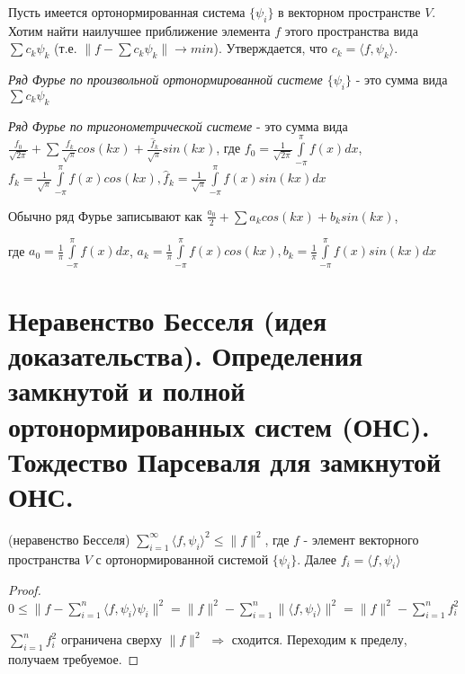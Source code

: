 \documentclass{article}
\begin{document}
	Пусть имеется ортонормированная система $\{{\psi_i}\}$ в векторном пространстве $V$. Хотим найти наилучшее приближение элемента $f$ этого пространства вида $\sum c_k \psi_k$ (т.е. $\|f-\sum c_k \psi_k\| \rightarrow min$). Утверждается, что $c_k=\langle f, \psi_k\rangle$.
	
	 \begin{definition}
	 	\textit{Ряд Фурье по произвольной ортонормированной системе $\{{\psi_i}\}$} - это сумма вида $\sum c_k \psi_k$
	 \end{definition}
 
	 \begin{definition}
	 	\textit{Ряд Фурье по тригонометрической системе} - это сумма вида $\frac{f_0}{\sqrt{2\pi}} +\sum \frac{f_k}{\sqrt{\pi}}cos(kx) + \frac{\hat f_k}{\sqrt{\pi}}sin(kx)$, где $f_0=\frac{1}{\sqrt{2\pi}}\int\limits_{-\pi}^{\pi} f(x) dx$, $f_k=\frac{1}{\sqrt{\pi}}\int\limits_{-\pi}^{\pi} f(x)cos(kx), \hat f_k=\frac{1}{\sqrt{\pi}}\int\limits_{-\pi}^{\pi} f(x)sin(kx) dx$
	 \end{definition}
 
 	Обычно ряд Фурье записывают как $\frac{a_0}{2} + \sum a_k cos(kx) + b_k sin(kx)$,
 	
 	где $a_0=\frac{1}{\pi}\int\limits_{-\pi}^{\pi} f(x) dx$, $a_k=\frac{1}{\pi}\int\limits_{-\pi}^{\pi} f(x)cos(kx), b_k=\frac{1}{\pi}\int\limits_{-\pi}^{\pi} f(x)sin(kx) dx$
	
	\section{Неравенство Бесселя (идея доказательства). Определения замкнутой и полной ортонормированных систем (ОНС). Тождество Парсеваля для замкнутой ОНС.}
	
	\begin{theorem} 
		(неравенство Бесселя) $\sum_{i=1}^{\infty} \langle f, \psi_i \rangle^2 \le \| f \|^2$, где $f$ - элемент векторного пространства $V$ с ортонормированной системой $\{{\psi_i}\}$. Далее $f_i=\langle f, \psi_i \rangle$
	\end{theorem}
	\begin{proof}
		$0 \le \| f- \sum_{i=1}^{n} \langle f, \psi_i \rangle \psi_i \|^2=\|f\|^2-\sum_{i=1}^{n} \|\langle f, \psi_i \rangle \|^2=\|f\|^2-\sum_{i=1}^{n} f_i ^2$ 
		
		$\sum_{i=1}^{n} f_i^2$ ограничена сверху $\|f\|^2$ $\Rightarrow$  сходится. Переходим к пределу, получаем требуемое. 
	\end{proof}
\end{document}
